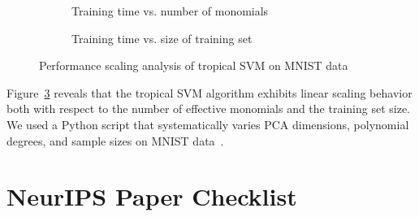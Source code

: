 \documentclass{article}
\begin{document}
\begin{figure}[htbp]
    \centering
    \begin{subfigure}{0.48\textwidth}
        \centering
        \resizebox{0.95\textwidth}{!}{}
        \caption{Training time vs. number of monomials}
        \label{fig:pca_degree_scaling}
    \end{subfigure}
    \hfill  %
    \begin{subfigure}{0.48\textwidth}
        \centering
        \resizebox{0.95\textwidth}{!}{}
        \caption{Training time vs. size of training set}
        \label{fig:sample_size_scaling}
    \end{subfigure}
    \caption{Performance scaling analysis of tropical SVM on MNIST data}
    \label{fig:scaling_analysis}
\end{figure}

Figure~\ref{fig:scaling_analysis} reveals that the tropical SVM algorithm exhibits linear scaling behavior both with respect to the number of effective monomials and the training set size. We used a Python script that systematically varies PCA dimensions, polynomial degrees, and sample sizes on MNIST data \cite{MNIST}.

\newpage
\section*{NeurIPS Paper Checklist}
\end{document}
